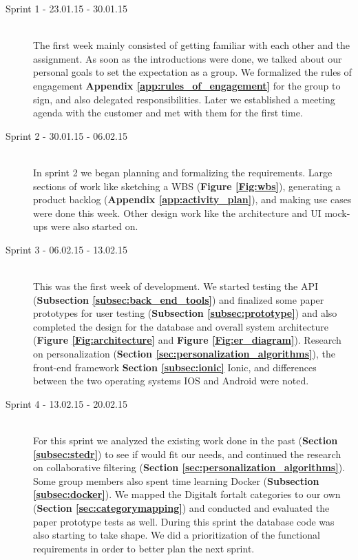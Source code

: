 \begin{description}
	
	\item[Sprint 1 - 23.01.15 - 30.01.15] \hfill \\ 
	The first week mainly consisted of getting familiar with each other and the assignment. As soon as the introductions were done, we talked about our personal goals to set the expectation as a group. We formalized the rules of engagement \textbf{Appendix \ref{app:rules_of_engagement}} for the group to sign, and also delegated responsibilities. Later we established a meeting agenda with the customer and met with them for the first time.
	
	\item[Sprint 2 - 30.01.15 - 06.02.15] \hfill \\ 
	In sprint 2 we began planning and formalizing the requirements. Large sections of work like sketching a WBS (\textbf{Figure \ref{Fig:wbs}}), generating a product backlog (\textbf{Appendix \ref{app:activity_plan}}), and making use cases were done this week. Other design work like the architecture and UI mock-ups were also started on.
	
	\item[Sprint 3 - 06.02.15 - 13.02.15] \hfill \\ 
	This was the first week of development. We started testing the API (\textbf{Subsection \ref{subsec:back_end_tools}}) and finalized some paper prototypes for user testing (\textbf{Subsection \ref{subsec:prototype}}) and also completed the design for the database and overall system architecture (\textbf{Figure \ref{Fig:architecture}} and \textbf{Figure \ref{Fig:er_diagram}}). Research on personalization (\textbf{Section \ref{sec:personalization_algorithms}}), the front-end framework \textbf{Section \ref{subsec:ionic}} Ionic, and differences between the two operating systems IOS and Android were noted.
	
	\item[Sprint 4 - 13.02.15 - 20.02.15] \hfill \\ 
	For this sprint we analyzed the existing work done in the past (\textbf {Section \ref{subsec:stedr}}) to see if would fit our needs, and continued the research on collaborative filtering (\textbf {Section \ref{sec:personalization_algorithms}}). Some group members also spent time learning Docker (\textbf {Subsection \ref{subsec:docker}}). We mapped the Digitalt fortalt categories to our own (\textbf{Section \ref{sec:categorymapping}}) and conducted and evaluated the paper prototype tests as well. During this sprint the database code was also starting to take shape. We did a prioritization of the functional requirements in order to better plan the next sprint.  
	

\end{description}

